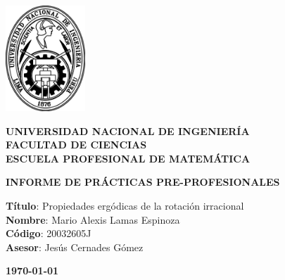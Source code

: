 \documentclass[a4paper,12pt]{report}
\theoremstyle{definition}
\begin{document}
	\begin{center}
		\includegraphics[width=3cm]{logo.jpg}\\		
	\end{center}
	\begin{center}
		{\Large \textbf{UNIVERSIDAD NACIONAL DE INGENIERÍA\\
			FACULTAD DE CIENCIAS\\
			ESCUELA PROFESIONAL DE MATEMÁTICA}}
	\end{center}
	
	\vspace{1cm}
	
	\begin{center}
		{\Large \textbf{INFORME DE PRÁCTICAS PRE-PROFESIONALES}}
	\end{center}

	\vspace{2cm}

	\begin{center}
		{\Large \textbf{Título}: Propiedades ergódicas de la rotación irracional\\		
		\textbf{Nombre}: Mario Alexis Lamas Espinoza\\		
		\textbf{Código}: 20032605J\\			
		\textbf{Asesor}: Jesús Cernades Gómez\\}
	\end{center}

	\begin{center}
		{\Large \textbf{\today}}
	\end{center}
	
	\onehalfspacing
	
	\tableofcontents
	
	
	
	 
	
	
	
	
\printbibliography[heading=bibintoc]
\end{document}
